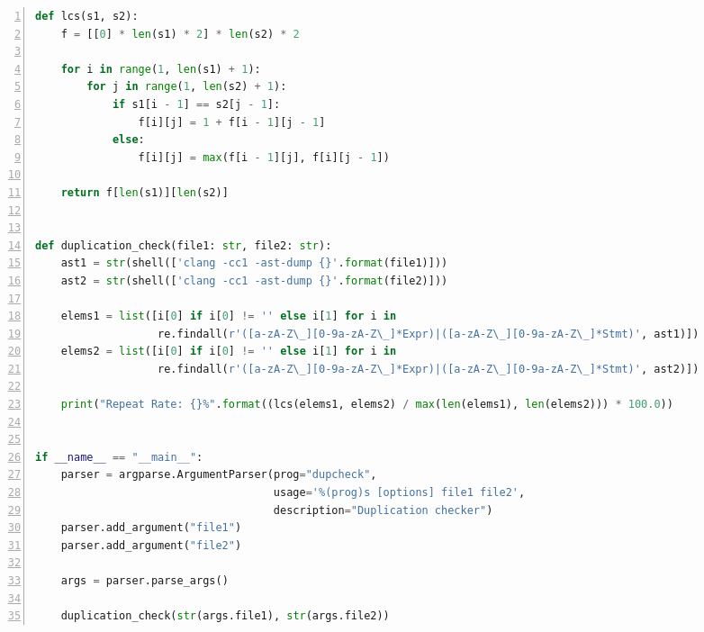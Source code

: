 \documentclass[a4paper,twoside]{article}
\begin{document}
\begin{spacing}{1.2}
\begin{lstlisting}[language=Python,numbers=left,style=PythonStyle,caption=查重程序,label={code:dupcheckfull}]
def lcs(s1, s2):
    f = [[0] * len(s1) * 2] * len(s2) * 2

    for i in range(1, len(s1) + 1):
        for j in range(1, len(s2) + 1):
            if s1[i - 1] == s2[j - 1]:
                f[i][j] = 1 + f[i - 1][j - 1]
            else:
                f[i][j] = max(f[i - 1][j], f[i][j - 1])

    return f[len(s1)][len(s2)]


def duplication_check(file1: str, file2: str):
    ast1 = str(shell(['clang -cc1 -ast-dump {}'.format(file1)]))
    ast2 = str(shell(['clang -cc1 -ast-dump {}'.format(file2)]))

    elems1 = list([i[0] if i[0] != '' else i[1] for i in
                   re.findall(r'([a-zA-Z\_][0-9a-zA-Z\_]*Expr)|([a-zA-Z\_][0-9a-zA-Z\_]*Stmt)', ast1)])
    elems2 = list([i[0] if i[0] != '' else i[1] for i in
                   re.findall(r'([a-zA-Z\_][0-9a-zA-Z\_]*Expr)|([a-zA-Z\_][0-9a-zA-Z\_]*Stmt)', ast2)])

    print("Repeat Rate: {}%".format((lcs(elems1, elems2) / max(len(elems1), len(elems2))) * 100.0))


if __name__ == "__main__":
    parser = argparse.ArgumentParser(prog="dupcheck",
                                     usage='%(prog)s [options] file1 file2',
                                     description="Duplication checker")
    parser.add_argument("file1")
    parser.add_argument("file2")

    args = parser.parse_args()

    duplication_check(str(args.file1), str(args.file2))

\end{lstlisting}

\end{spacing}
\end{document}
